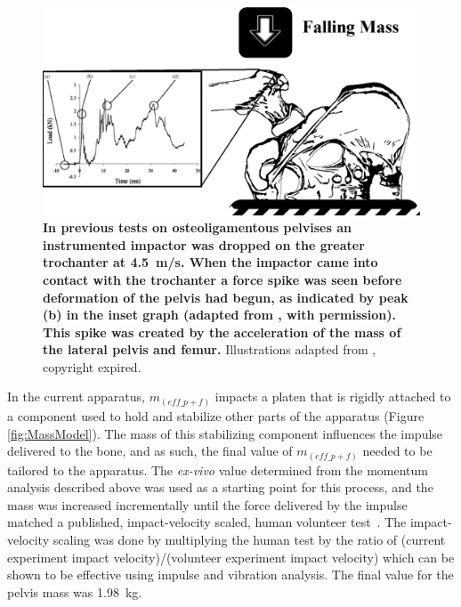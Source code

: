 		\begin{figure}
			\centering
			\includegraphics[width=1\linewidth]{./impactor/figures/BeasonComparison}
			\caption[Explanation of femur and lateral pelvis mass]{\textbf{In previous tests on osteoligamentous pelvises an instrumented impactor was dropped on the greater trochanter at 4.5~\ac{m}/\ac{s}.
			When the impactor came into contact with the trochanter a force spike was seen before deformation of the pelvis had begun, as indicated by peak (b) in the inset graph (adapted from \citet{beason_bone_2003}, with permission).
			This spike was created by the acceleration of the mass of the lateral pelvis and femur.}
			Illustrations adapted from \citet{gray_anatomy_1918}, copyright expired.}
			\label{fig:CompBeason}
		\end{figure}
		
		In the current apparatus, $m_{(eff\_p+f)}$ impacts a platen that is rigidly attached to a component used to hold and stabilize other parts of the apparatus (Figure \ref{fig:MassModel}).
		The mass of this stabilizing component influences the impulse delivered to the bone, and as such, the final value of $m_{(eff\_p+f)}$ needed to be tailored to the apparatus.
		The \textit{ex-vivo} value determined from the momentum analysis described above was used as a starting point for this process, and the mass was increased incrementally until the force delivered by the impulse matched a published, impact-velocity scaled, human volunteer test~\citep{laing_characterizing_2010}.
		The impact-velocity scaling was done by multiplying the human test by the ratio of (current experiment impact velocity)/(volunteer experiment impact velocity) which can be shown to be effective using impulse and vibration analysis.
		The final value for the pelvis mass was 1.98~\ac{kg}.

